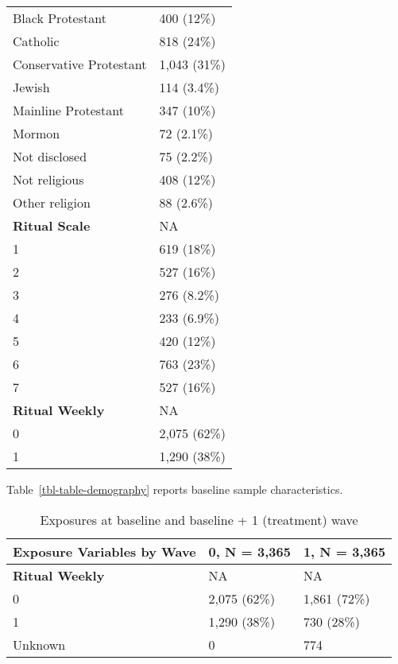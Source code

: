 \documentclass[
  single column]{article}
\begin{document}
\begin{longtable}[]{@{}ll@{}}
Black Protestant & 400 (12\%) \\
Catholic & 818 (24\%) \\
Conservative Protestant & 1,043 (31\%) \\
Jewish & 114 (3.4\%) \\
Mainline Protestant & 347 (10\%) \\
Mormon & 72 (2.1\%) \\
Not disclosed & 75 (2.2\%) \\
Not religious & 408 (12\%) \\
Other religion & 88 (2.6\%) \\
\textbf{Ritual Scale} & NA \\
1 & 619 (18\%) \\
2 & 527 (16\%) \\
3 & 276 (8.2\%) \\
4 & 233 (6.9\%) \\
5 & 420 (12\%) \\
6 & 763 (23\%) \\
7 & 527 (16\%) \\
\textbf{Ritual Weekly} & NA \\
0 & 2,075 (62\%) \\
1 & 1,290 (38\%) \\

\end{longtable}

Table~\ref{tbl-table-demography} reports baseline sample
characteristics.

\newpage{}

\begin{longtable}[]{@{}lll@{}}

\caption{\label{tbl-table-exposures-code}Exposures at baseline and
baseline + 1 (treatment) wave}

\tabularnewline

\toprule\noalign{}
\textbf{Exposure Variables by Wave} & \textbf{0}, N = 3,365 &
\textbf{1}, N = 3,365 \\
\midrule\noalign{}
\endhead
\bottomrule\noalign{}
\endlastfoot
\textbf{Ritual Weekly} & NA & NA \\
0 & 2,075 (62\%) & 1,861 (72\%) \\
1 & 1,290 (38\%) & 730 (28\%) \\
Unknown & 0 & 774 \\

\end{longtable}
\end{document}
